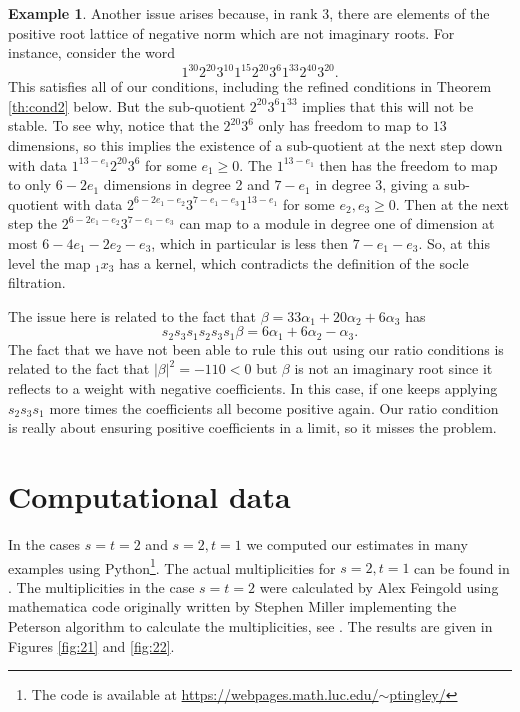 \documentclass{amsart}
\numberwithin{equation}{section}
\numberwithin{figure}{section}
\numberwithin{table}{section}
\theoremstyle{definition}
\newtheorem{Example}[equation]{Example}
\begin{document}
\begin{Example} \label{ex:strangeneg} Another issue arises because, in rank 3, there are elements of the positive root lattice of negative norm which are not imaginary roots. For instance, consider the word
	$$ 1^{30} 2^{20} 3^{10} 1^{15} 2^{20} 3^{6} 1^{33} 2^{40} 3^{20}.$$
	This satisfies all of our conditions, including the refined conditions in Theorem \ref{th:cond2} below. But the sub-quotient $2^{20} 3^{6} 1^{33}$ implies that this will not be stable. To see why, notice that the $2^{20} 3^{6}$ only has freedom to map to $13$ dimensions, so this implies the existence of a sub-quotient at the next step down with data $1^{13-e_1} 2^{20} 3^{6}$ for some $e_1\geq 0$. The $1^{13-e_1}$ then has the freedom to map to only $6-2e_1$ dimensions in degree 2 and $7-e_1$ in degree $3$, giving a sub-quotient with data
	$2^{6-2e_1-e_2} 3^{7-e_1-e_3} 1^{13-e_1}$ for some $e_2,e_3 \geq 0$. Then at the next step the $2^{6-2e_1-e_2} 3^{7-e_1-e_3}$ can map to a module in degree one of dimension at most $6-4e_1-2e_2-e_3$, which in particular is less then $7-e_1-e_3$. So, at this level the map ${}_1 x_3$ has a kernel, which contradicts the definition of the socle filtration. 
	
	The issue here is related to the fact that $ \beta= 33\alpha_1+20\alpha_2+6 \alpha_3$ has
	$$s_2s_3s_1s_2s_3s_1 \beta = 6\alpha_1+6\alpha_2-\alpha_3.$$
	The fact that we have not been able to rule this out using our ratio conditions is related to the fact that  $|\beta|^2=-110<0$ %
	but $\beta$ is not an imaginary root since it reflects to a weight with negative coefficients. In this case, if one keeps applying $s_2s_3s_1$ more times the coefficients all become positive again. Our ratio condition is really about ensuring positive coefficients in a limit, so it misses the problem. 
	
\end{Example}





\section{Computational data }  %
In the cases $s=t=2$ and $
s=2,t=1$ we computed our estimates in many examples using Python\footnote{The code is available at \href{https://webpages.math.luc.edu/~ptingley/lecturenotes/rootmultscode-rank3.py}{https://webpages.math.luc.edu/$\sim$ptingley/}}. The actual multiplicities for $s=2,t=1$ can be found in \cite[Chapter 11]{Kac:1990}. The multiplicities in the case $s=t=2$ were calculated by Alex Feingold using mathematica code originally written by Stephen Miller implementing the Peterson algorithm to calculate the multiplicities, see \cite{Pete:rec}. The results are given in Figures \ref{fig:21} and \ref{fig:22}. 
\end{document}
